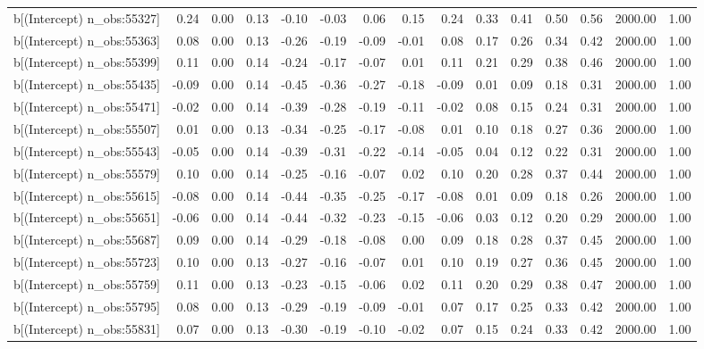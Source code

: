 \begin{table}[ht]
\begin{tabular}{rrrrrrrrrrrrrrr}
  b[(Intercept) n\_obs:55327] & 0.24 & 0.00 & 0.13 & -0.10 & -0.03 & 0.06 & 0.15 & 0.24 & 0.33 & 0.41 & 0.50 & 0.56 & 2000.00 & 1.00 \\ 
  b[(Intercept) n\_obs:55363] & 0.08 & 0.00 & 0.13 & -0.26 & -0.19 & -0.09 & -0.01 & 0.08 & 0.17 & 0.26 & 0.34 & 0.42 & 2000.00 & 1.00 \\ 
  b[(Intercept) n\_obs:55399] & 0.11 & 0.00 & 0.14 & -0.24 & -0.17 & -0.07 & 0.01 & 0.11 & 0.21 & 0.29 & 0.38 & 0.46 & 2000.00 & 1.00 \\ 
  b[(Intercept) n\_obs:55435] & -0.09 & 0.00 & 0.14 & -0.45 & -0.36 & -0.27 & -0.18 & -0.09 & 0.01 & 0.09 & 0.18 & 0.31 & 2000.00 & 1.00 \\ 
  b[(Intercept) n\_obs:55471] & -0.02 & 0.00 & 0.14 & -0.39 & -0.28 & -0.19 & -0.11 & -0.02 & 0.08 & 0.15 & 0.24 & 0.31 & 2000.00 & 1.00 \\ 
  b[(Intercept) n\_obs:55507] & 0.01 & 0.00 & 0.13 & -0.34 & -0.25 & -0.17 & -0.08 & 0.01 & 0.10 & 0.18 & 0.27 & 0.36 & 2000.00 & 1.00 \\ 
  b[(Intercept) n\_obs:55543] & -0.05 & 0.00 & 0.14 & -0.39 & -0.31 & -0.22 & -0.14 & -0.05 & 0.04 & 0.12 & 0.22 & 0.31 & 2000.00 & 1.00 \\ 
  b[(Intercept) n\_obs:55579] & 0.10 & 0.00 & 0.14 & -0.25 & -0.16 & -0.07 & 0.02 & 0.10 & 0.20 & 0.28 & 0.37 & 0.44 & 2000.00 & 1.00 \\ 
  b[(Intercept) n\_obs:55615] & -0.08 & 0.00 & 0.14 & -0.44 & -0.35 & -0.25 & -0.17 & -0.08 & 0.01 & 0.09 & 0.18 & 0.26 & 2000.00 & 1.00 \\ 
  b[(Intercept) n\_obs:55651] & -0.06 & 0.00 & 0.14 & -0.44 & -0.32 & -0.23 & -0.15 & -0.06 & 0.03 & 0.12 & 0.20 & 0.29 & 2000.00 & 1.00 \\ 
  b[(Intercept) n\_obs:55687] & 0.09 & 0.00 & 0.14 & -0.29 & -0.18 & -0.08 & 0.00 & 0.09 & 0.18 & 0.28 & 0.37 & 0.45 & 2000.00 & 1.00 \\ 
  b[(Intercept) n\_obs:55723] & 0.10 & 0.00 & 0.13 & -0.27 & -0.16 & -0.07 & 0.01 & 0.10 & 0.19 & 0.27 & 0.36 & 0.45 & 2000.00 & 1.00 \\ 
  b[(Intercept) n\_obs:55759] & 0.11 & 0.00 & 0.13 & -0.23 & -0.15 & -0.06 & 0.02 & 0.11 & 0.20 & 0.29 & 0.38 & 0.47 & 2000.00 & 1.00 \\ 
  b[(Intercept) n\_obs:55795] & 0.08 & 0.00 & 0.13 & -0.29 & -0.19 & -0.09 & -0.01 & 0.07 & 0.17 & 0.25 & 0.33 & 0.42 & 2000.00 & 1.00 \\ 
  b[(Intercept) n\_obs:55831] & 0.07 & 0.00 & 0.13 & -0.30 & -0.19 & -0.10 & -0.02 & 0.07 & 0.15 & 0.24 & 0.33 & 0.42 & 2000.00 & 1.00 \\ 

\end{tabular}
\end{table}
